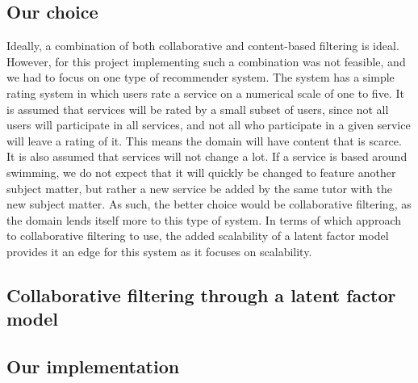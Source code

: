 \subsection{Our choice}
Ideally, a combination of both collaborative and content-based filtering is ideal.
However, for this project implementing such a combination was not feasible, and we had to focus on one type of recommender system.
The system has a simple rating system in which users rate a service on a numerical scale of one to five.
It is assumed that services will be rated by a small subset of users, since not all users will participate in all services, and not all who participate in a given service will leave a rating of it.
This means the domain will have content that is scarce.
It is also assumed that services will not change a lot.
If a service is based around swimming, we do not expect that it will quickly be changed to feature another subject matter, but rather a new service be added by the same tutor with the new subject matter.
As such, the better choice would be collaborative filtering, as the domain lends itself more to this type of system.
In terms of which approach to collaborative filtering to use, the added scalability of a latent factor model provides it an edge for this system as it focuses on scalability.

\subsection{Collaborative filtering through a latent factor model}


\subsection{Our implementation}
